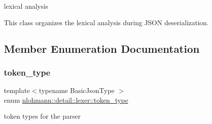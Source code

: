 lexical analysis 

This class organizes the lexical analysis during J\+S\+ON deserialization. 

\subsection{Member Enumeration Documentation}
\mbox{\label{classnlohmann_1_1detail_1_1lexer_a3f313cdbe187cababfc5e06f0b69b098}} 
\subsubsection{\texorpdfstring{token\+\_\+type}{token\_type}}
{\footnotesize\ttfamily template$<$typename Basic\+Json\+Type $>$ \\
enum \hyperlink{classnlohmann_1_1detail_1_1lexer_a3f313cdbe187cababfc5e06f0b69b098}{nlohmann\+::detail\+::lexer\+::token\+\_\+type}\hspace{0.3cm}{\ttfamily [strong]}}



token types for the parser 

